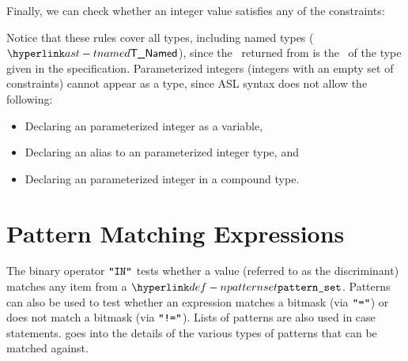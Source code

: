 Finally, we can check whether an integer value satisfies any of the constraints:
\begin{mathpar}
\end{mathpar}

\begin{mathpar}
\end{mathpar}

Notice that these rules cover all types, including named types ($\TNamed$),
since the \typedast\ returned from  is the \structure\ of the type
given in the specification.
%
Parameterized integers (integers with an empty set of constraints)
cannot appear as a type, since ASL syntax does not allow the following:
\begin{itemize}
\item Declaring an parameterized integer as a variable,
\item Declaring an alias to an parameterized integer type, and
\item Declaring an parameterized integer in a compound type.
\end{itemize}

\section{Pattern Matching Expressions\label{sec:PatternMatchingExpressions}}
The binary operator $\Tin$ tests whether a value (referred to as the discriminant) matches any item from a $\Npatternset$.
Patterns can also be used to test whether an expression matches a bitmask (via $\Teq$) or does not match a bitmask (via $\Tneq$).
Lists of patterns are also used in case statements.
%
 goes into the details of the various types of patterns that can be matched against.

